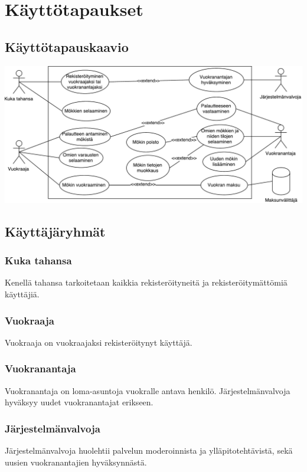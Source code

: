 \chapter{Käyttötapaukset}

\section{Käyttötapauskaavio}
\includegraphics[width = 14cm]{./diagrams/drawio_usecase.pdf}

\section{Käyttäjäryhmät}

\subsection*{Kuka tahansa}
Kenellä tahansa tarkoitetaan kaikkia rekisteröityneitä ja rekisteröitymättömiä käyttäjiä.

\subsection*{Vuokraaja}
Vuokraaja on vuokraajaksi rekisteröitynyt käyttäjä.

\subsection*{Vuokranantaja}
Vuokranantaja on loma-asuntoja vuokralle antava henkilö. Järjestelmänvalvoja hyväksyy uudet vuokranantajat erikseen.

\subsection*{Järjestelmänvalvoja}
Järjestelmänvalvoja huolehtii palvelun moderoinnista ja ylläpitotehtävistä, sekä uusien vuokranantajien hyväksynnästä.

